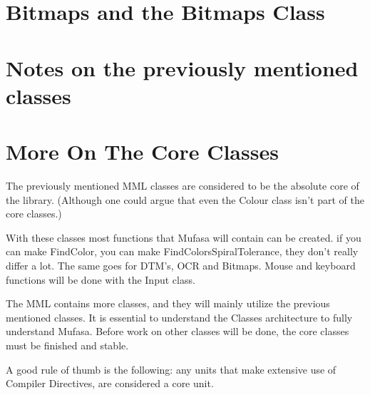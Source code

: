 \documentclass[a4paper, 10pt]{report} %
\begin{document}
\section{Bitmaps and the Bitmaps Class}



\section{Notes on the previously mentioned classes}


\section{More On The Core Classes}

The previously mentioned MML classes are considered to be the absolute core of the library. (Although one could argue that even the Colour class isn't part of the core classes.)

With these classes most functions that Mufasa will contain can be created. if you can make FindColor, you can make FindColorsSpiralTolerance, they don't really differ a lot. The same goes for DTM's, OCR and Bitmaps. Mouse and keyboard functions will be done with the Input class.

The MML contains more classes, and they will mainly utilize the previous mentioned classes.
It is essential to understand the Classes architecture to fully understand Mufasa.
Before work on other classes will be done, the core classes must be finished and stable.

A good rule of thumb is the following: any units that make extensive use of Compiler Directives, are considered a core unit.
\end{document}
